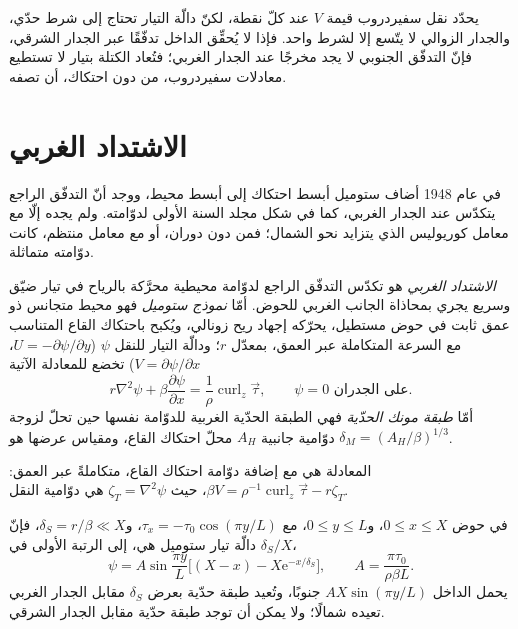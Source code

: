 يحدّد نقل سفيردروب قيمة $V$ عند كلّ نقطة، لكنّ دالّة التيار
تحتاج إلى شرط حدّي، والجدار الزوالي لا يتّسع إلا لشرط واحد. فإذا
لا يُحقِّق الداخل تدفّقًا عبر الجدار الشرقي، فإنّ التدفّق الجنوبي
لا يجد مخرجًا عند الجدار الغربي؛ فتُعاد الكتلة بتيار
لا تستطيع معادلات سفيردروب، من دون احتكاك، أن تصفه.

\section{الاشتداد الغربي}\label{sec:b3:ocean-dynamics:western}

في عام 1948 أضاف ستوميل أبسط احتكاك إلى أبسط محيط، ووجد
أنّ التدفّق الراجع يتكدّس عند الجدار الغربي، كما في شكل
مجلد السنة الأولى لدوّامته. ولم يجده إلّا مع معامل كوريوليس
الذي يتزايد نحو الشمال؛ فمن دون دوران، أو مع معامل منتظم،
كانت دوّامته متماثلة.

\begin{definition}\label{def:b3:ocean-dynamics:western-intensification}
\emph{الاشتداد الغربي} هو
تكدّس التدفّق الراجع لدوّامة محيطية محرَّكة بالرياح في تيار ضيّق وسريع
يجري بمحاذاة الجانب الغربي للحوض. أمّا \emph{نموذج ستوميل}
فهو محيط متجانس ذو عمق ثابت في حوض مستطيل،
يحرّكه إجهاد ريح زونالي، ويُكبح باحتكاك القاع
المتناسب مع السرعة المتكاملة عبر العمق، بمعدّل $r$؛
ودالّة التيار للنقل $\psi$ ($U = -\partial\psi/\partial y$، $V =
\partial\psi/\partial x$) تخضع للمعادلة الآتية
\[
r\nabla^2\psi + \beta\frac{\partial\psi}{\partial x} =
\frac{1}{\rho}\operatorname{curl}_z\vec\tau ,\qquad \psi = 0 \text{ على الجدران.}
\]
أمّا \emph{طبقة مونك الحدّية} فهي الطبقة الحدّية الغربية
للدوّامة نفسها حين تحلّ لزوجة دوّامية جانبية $A_H$
محلّ احتكاك القاع، ومقياس عرضها هو $\delta_M =
(A_H/\beta)^{1/3}$.
\end{definition}

المعادلة هي  مع إضافة دوّامة احتكاك القاع،
متكاملةً عبر العمق: $\beta V = \rho^{-1}\operatorname{curl}_z
\vec\tau - r\zeta_T$، حيث $\zeta_T = \nabla^2\psi$ هي دوّامية
النقل.

\begin{theorem}\label{thm:b3:ocean-dynamics:stommel}
في حوض $0 \le x \le X$، و$0 \le y \le L$، مع $\tau_x = -\tau_0
\cos(\pi y/L)$، و$\delta_S = r/\beta \ll X$، فإنّ دالّة تيار ستوميل
هي، إلى الرتبة الأولى في $\delta_S/X$،
\[
\psi = A\sin\frac{\pi y}{L}\Big[(X - x) - X\mathrm e^{-x/\delta_S}\Big],
\qquad A = \frac{\pi\tau_0}{\rho\beta L} .
\]
يحمل الداخل $AX\sin(\pi y/L)$ جنوبًا، وتُعيد طبقة حدّية بعرض
$\delta_S$ مقابل الجدار الغربي تعيده شمالًا؛ ولا يمكن أن
توجد طبقة حدّية مقابل الجدار الشرقي.
\end{theorem}

